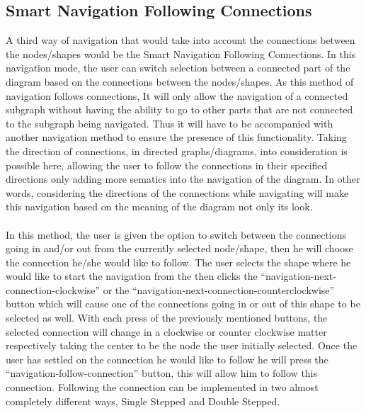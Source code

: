 \subsection{Smart Navigation Following Connections}
A third way of navigation that would take into account the connections between the nodes/shapes would be the Smart Navigation Following Connections. In this navigation mode, the user can switch selection between a connected part of the diagram based on the connections between the nodes/shapes. As this method of navigation follows connections, It will only allow the navigation of a connected subgraph without having the ability to go to other parts that are not connected to the subgraph being navigated. Thus it will have to be accompanied with another navigation method to ensure the presence of this functionality. Taking the direction of connections, in directed graphs/diagrams, into consideration is possible here, allowing the user to follow the connections in their specified directions only adding more sematics into the navigation of the diagram. In other words, considering the directions of the connections while navigating will make this navigation based on the meaning of the diagram not only its look.

\paragraph{}
In this method, the user is given the option to switch between the connections going in and/or out from the currently selected node/shape, then he will choose the connection he/she would like to follow. The user selects the shape where he would like to start the navigation from the then clicks the ``navigation-next-connection-clockwise'' or the ``navigation-next-connection-counterclockwise'' button which will cause one of the connections going in or out of this shape to be selected as well. With each press of the previously mentioned buttons, the selected connection will change in a clockwise or counter clockwise matter respectively taking the center to be the node the user initially selected. Once the user has settled on the connection he would like to follow he will press the ``navigation-follow-connection'' button, this will allow him to follow this connection. Following the connection can be implemented in two almost completely different ways, Single Stepped and Double Stepped.


